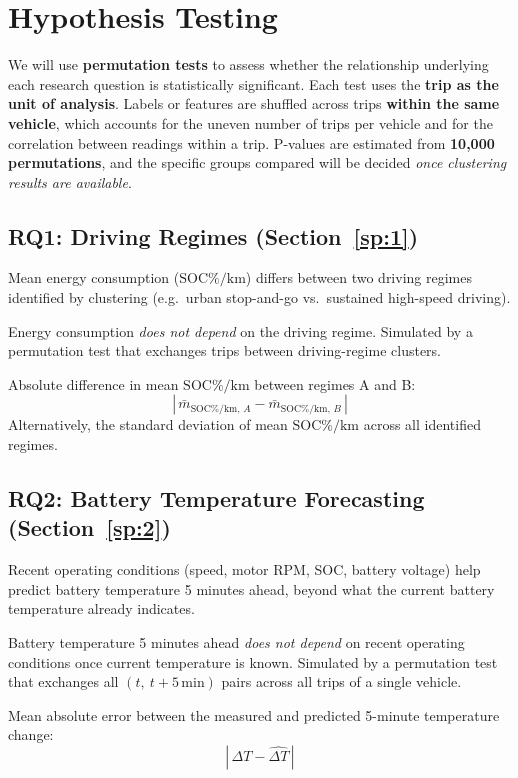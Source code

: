 \documentclass[11pt,letterpaper]{article}
\newenvironment{rqblock}{\par\noindent\begin{minipage}{\linewidth}\setlength{\parskip}{4pt}}{\end{minipage}\par}
\newcommand{\socpk}{\mathrm{SOC\%/km}}
\begin{document}
\section{Hypothesis Testing}

We will use \textbf{permutation tests} to assess whether the relationship underlying each research question is statistically significant. Each test uses the \textbf{trip as the unit of analysis}. Labels or features are shuffled across trips \textbf{within the same vehicle}, which accounts for the uneven number of trips per vehicle and for the correlation between readings within a trip. P-values are estimated from \textbf{10,000 permutations}, and the specific groups compared will be decided \textit{once clustering results are available}.

\subsection{RQ1: Driving Regimes \textnormal{(Section~\ref{sp:1})}}
\begin{rqblock}\begin{hyp}
  \item[Hypothesis:] Mean energy consumption ($\socpk$) differs between two driving regimes identified by clustering (e.g.\ urban stop-and-go vs.\ sustained high-speed driving).
  \item[Null hypothesis ($H_0$):] Energy consumption \textit{does not depend} on the driving regime. Simulated by a permutation test that exchanges trips between driving-regime clusters.
  \item[Test statistic:] Absolute difference in mean $\socpk$ between regimes A and B:\[\left|\,\bar{m}_{\socpk,\,A} - \bar{m}_{\socpk,\,B}\,\right|\]Alternatively, the standard deviation of mean $\socpk$ across all identified regimes.
\end{hyp}\end{rqblock}

\subsection{RQ2: Battery Temperature Forecasting \textnormal{(Section~\ref{sp:2})}}
\begin{rqblock}\begin{hyp}
  \item[Hypothesis:] Recent operating conditions (speed, motor RPM, SOC, battery voltage) help predict battery temperature 5 minutes ahead, beyond what the current battery temperature already indicates.
  \item[Null hypothesis ($H_0$):] Battery temperature 5 minutes ahead \textit{does not depend} on recent operating conditions once current temperature is known. Simulated by a permutation test that exchanges all $(t,\ t+5\,\text{min})$ pairs across all trips of a single vehicle.
  \item[Test statistic:] Mean absolute error between the measured and predicted 5-minute temperature change:\[\left|\,\Delta T - \widehat{\Delta T}\,\right|\]
\end{hyp}\end{rqblock}
\end{document}
